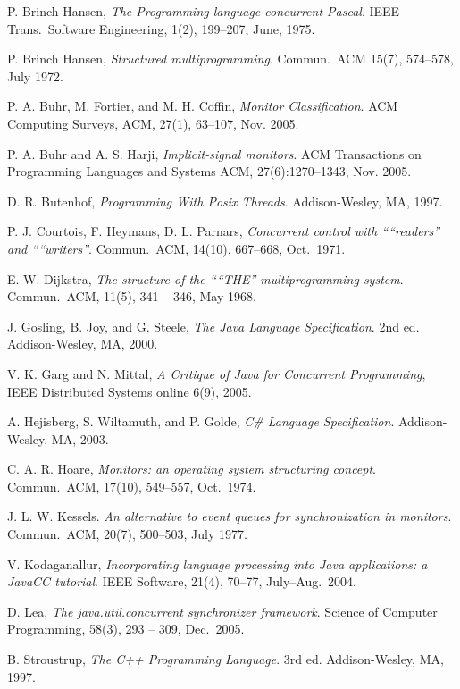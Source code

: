 \documentclass[preprint]{sigplanconf}
\begin{document}
\begin{thebibliography}{}
\softraggedright

  P. Brinch Hansen, \emph{The Programming language concurrent Pascal}. IEEE
  Trans.~Software Engineering, 1(2), 199--207, June, 1975.

    P. Brinch Hansen, \emph{Structured multiprogramming}. Commun.~ACM 15(7),
    574--578, July 1972.

  P. A. Buhr, M. Fortier, and M. H. Coffin, \emph{Monitor Classification}. ACM 
  Computing Surveys, ACM, 27(1), 63--107, 
  Nov. 2005.
  
  P. A. Buhr and A. S. Harji, \emph{Implicit-signal monitors}. ACM 
  Transactions on Programming Languages and Systems ACM, 27(6):1270--1343, 
  Nov. 2005.

  D. R. Butenhof, \emph{Programming With Posix Threads}.
  Addison-Wesley, MA, 1997.

    P. J. Courtois, F. Heymans, D. L. Parnars, \emph{Concurrent control with
    “``readers'' and “``writers''}. Commun.~ACM, 14(10), 667--668, Oct.~1971.

    E. W. Dijkstra, \emph{The structure of the “``THE''-multiprogramming
    system}. Commun.~ACM, 11(5), 341 -- 346, May 1968. 

    J. Gosling, B. Joy, and G. Steele, \emph{The Java Language Specification}.
    2nd ed. Addison-Wesley, MA, 2000. 

    V. K. Garg and N. Mittal, \emph{A Critique of Java for Concurrent
    Programming}, IEEE Distributed Systems online 6(9), 2005.

    A. Hejisberg, S. Wiltamuth, and P. Golde, \emph{C\# Language
    Specification}. Addison-Wesley, MA, 2003.

  C. A. R. Hoare, \emph{Monitors: an operating system structuring concept}. 
  Commun.~ACM, 17(10), 549--557, Oct.~1974. 

    J. L. W. Kessels. \emph{An alternative to event queues for synchronization 
    in monitors}. Commun.~ACM, 20(7), 500--503, July 1977.
  
    V. Kodaganallur, \emph{Incorporating language processing into Java 
    applications: a JavaCC tutorial}. IEEE Software, 21(4), 70--77,
    July--Aug.~2004. 

    D. Lea, \emph{The java.util.concurrent synchronizer framework}. Science of 
    Computer Programming, 58(3), 293 -- 309, Dec.~2005.

    B. Stroustrup, \emph{The C++ Programming Language}. 3rd ed. Addison-Wesley,
    MA, 1997.

\end{thebibliography}
\end{document}
